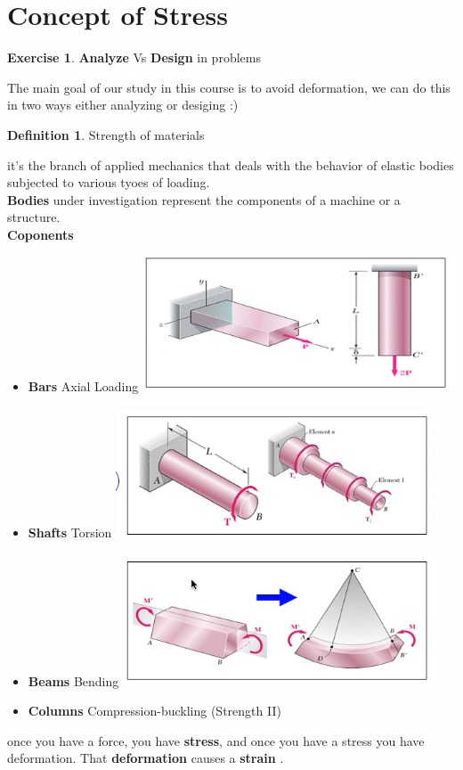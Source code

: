 \documentclass[11pt]{article}
\theoremstyle{definition}
\newtheorem{defn}{Definition}
\newtheorem{exer}{Exercise}
\begin{document}
\section{Concept of Stress}
\begin{exer}
	\textbf{Analyze } Vs \textbf{Design}  in problems

\end{exer}
The main goal of our study in this course is to avoid deformation, we can do this in two ways either analyzing or desiging :) 
\begin{defn}
Strength of materials
\end{defn}
it's the branch of applied mechanics that deals with the behavior of elastic bodies subjected to various tyoes of loading.\\
\textbf{Bodies} under investigation represent the components of a machine or a structure.\\
\textbf{Coponents}
\begin{itemize}

\item \textbf{Bars} Axial Loading \includegraphics[scale=0.5]{figures/2021-03-30_21-09.png}
\item \textbf{Shafts} Torsion \includegraphics[scale=0.5]{figures/2021-03-30_21-09_1.png}
\item \textbf{Beams} Bending \includegraphics[scale=0.5]{figures/2021-03-30_21-09_2.png}
\item \textbf{Columns} Compression-buckling (Strength II)
\end{itemize}
once you have a force, you have \textbf{stress}, and once you have a stress you have deformation. That \textbf{deformation} causes a \textbf{strain} .
\end{document}
